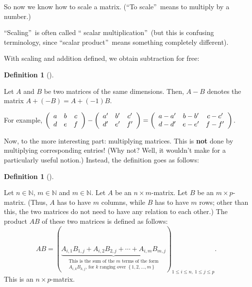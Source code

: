 \documentclass[numbers=enddot,12pt,final,onecolumn,notitlepage]{scrartcl}%
\theoremstyle{definition}
\newtheorem{defi}[theo]{Definition}
\newenvironment{definition}[1][]
{\begin{defi}[#1]\begin{leftbar}}
{\end{leftbar}\end{defi}}
\begin{document}
So now we know how to scale a matrix. (\textquotedblleft To
scale\textquotedblright\ means to multiply by a number.)

\textquotedblleft Scaling\textquotedblright\ is often called \textquotedblleft
scalar multiplication\textquotedblright\ (but this is confusing terminology,
since \textquotedblleft scalar product\textquotedblright\ means something
completely different).

With scaling and addition defined, we obtain subtraction for free:

\begin{definition}
Let $A$ and $B$ be two matrices of the same dimensions. Then, $A-B$ denotes
the matrix $A+\left(  -B\right)  =A+\left(  -1\right)  B$.
\end{definition}

For example, $\left(
\begin{array}
[c]{ccc}%
a & b & c\\
d & e & f
\end{array}
\right)  -\left(
\begin{array}
[c]{ccc}%
a^{\prime} & b^{\prime} & c^{\prime}\\
d^{\prime} & e^{\prime} & f^{\prime}%
\end{array}
\right)  =\left(
\begin{array}
[c]{ccc}%
a-a^{\prime} & b-b^{\prime} & c-c^{\prime}\\
d-d^{\prime} & e-e^{\prime} & f-f^{\prime}%
\end{array}
\right)  $.

Now, to the more interesting part: multiplying matrices. This is \textbf{not}
done by multiplying corresponding entries! (Why not? Well, it wouldn't make
for a particularly useful notion.) Instead, the definition goes as follows:

\begin{definition}
\label{def.AB}Let $n\in\mathbb{N}$, $m\in\mathbb{N}$ and $m\in\mathbb{N}$. Let
$A$ be an $n\times m$-matrix. Let $B$ be an $m\times p$-matrix. (Thus, $A$ has
to have $m$ columns, while $B$ has to have $m$ rows; other than this, the two
matrices do not need to have any relation to each other.) The product $AB$ of
these two matrices is defined as follows:%
\[
AB=\left(  \underbrace{A_{i,1}B_{1,j}+A_{i,2}B_{2,j}+\cdots+A_{i,m}B_{m,j}%
}_{\substack{\text{This is the sum of the }m\text{ terms of the form}%
\\A_{i,k}B_{k,j}\text{, for }k\text{ ranging over }\left\{  1,2,\ldots
,m\right\}  }}\right)  _{1\leq i\leq n,\ 1\leq j\leq p}.
\]
This is an $n\times p$-matrix.
\end{definition}
\end{document}
